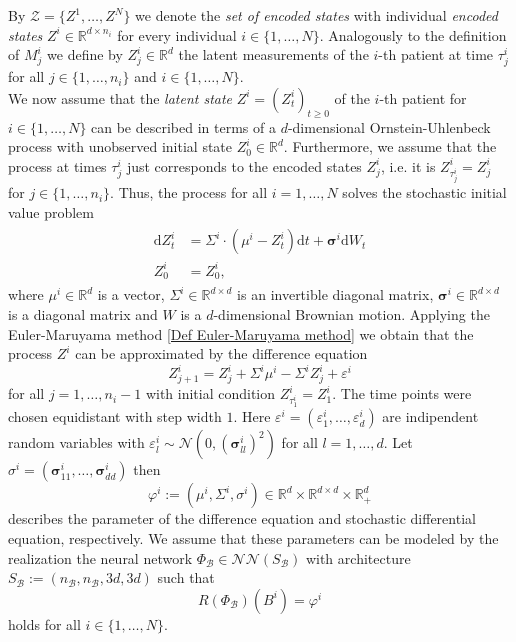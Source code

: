 \documentclass[11pt,titlepage]{article}
\newcommand{\R}{\mathbb{R}} %
\newcommand{\N}{\mathbb{N}} %
\theoremstyle{definition}
\theoremstyle{remark}
\begin{document}
	By $\mathcal{Z}=\{Z^1,\ldots,Z^N\}$ we denote the \textsl{set of encoded states} 
	with individual \textsl{encoded states} $Z^i\in\R^{d\times n_i}$ for every 
	individual $i\in\{1,\ldots,N\}$. 
	Analogously to the definition of $M^i_j$ we define by $Z^i_j\in\R^d$ the latent measurements of the $i$-th patient at time $\tau^i_j$ for all $j\in\{1,\ldots,n_i\}$ and  $i\in\{1,\ldots,N\}$.\\
	We now assume that the \textsl{latent state} $Z^i=(Z^i_t)_{t\geq 0}$ of the $i$-th patient for  $i\in\{1,\ldots, N\}$ can be described in terms of a $d$-dimensional Ornstein-Uhlenbeck process with unobserved initial state $Z^i_0\in \R^d$. Furthermore, we assume that the process at times 
	$\tau^i_j$ just corresponds to the encoded states $Z^i_j$, i.e. it is 
	$Z^i_{\tau^i_j}=Z^i_j$ for $j\in\{1,\ldots,n_i\}$. Thus, the process for all $i=1,\ldots,N$ solves the  stochastic initial value problem
	\begin{align}
		\begin{split} 
			\mathrm{d}Z_t^i &= \Sigma^i \cdot (\mu^i- Z_t^i)\mathrm{d}t +\boldsymbol{\sigma}^i \mathrm{d}W_t\\
			Z^i_0 &= Z^i_0, \label{SDE OUP}
		\end{split} 
	\end{align}
	where $\mu^i\in\R^d$ is a vector, $\Sigma^i\in\R^{d\times d}$ is an invertible diagonal matrix, $\boldsymbol{\sigma}^i\in\R^{d\times d}$ is a diagonal matrix and $W$ is a $d$-dimensional Brownian motion. Applying the Euler-Maruyama method \ref{Def Euler-Maruyama method} 
	we obtain that 
	the process $Z^i$ can be approximated by the difference equation
	\[Z^i_{j+1} = Z_j^i + \Sigma^i \mu^i - \Sigma^i Z_j^i + \varepsilon^i\]
	for all $j=1,\ldots, n_i -1$ with initial condition $Z^i_{\tau^i_1} = Z^i_1$. The time points were chosen equidistant with step width $1$. 
	Here $\varepsilon^i=(\varepsilon^i_1,\ldots,\varepsilon^i_d)$ are 
	indipendent random variables with 
	$\varepsilon^i_l \sim\mathcal{N}(0,(\boldsymbol{\sigma}^i_{ll})^2)$ for all $l=1,\ldots,d$. 
	Let $\sigma^i =(\boldsymbol{\sigma}^i_{11},\ldots,\boldsymbol{\sigma}^i_{dd})$ then
	\[\varphi^i:=(\mu^i,\Sigma^i,\sigma^i)\in\R^d\times \R^{d\times d}\times \R_+^d\]
	describes the parameter of the difference equation and stochastic differential equation, respectively. We assume that these parameters can be modeled by the realization the  
	neural network $\Phi_\mathcal{B}\in\mathcal{N}\mathcal{N}(S_\mathcal{B})$ with architecture $S_\mathcal{B} := (n_\mathcal{B}, n_\mathcal{B}, 3d, 3d)$ such that
	\[R(\Phi_\mathcal{B})(B^i)=\varphi^i\]
	holds for all $i\in\{1,\ldots,N\}$.\\
	
\end{document}
